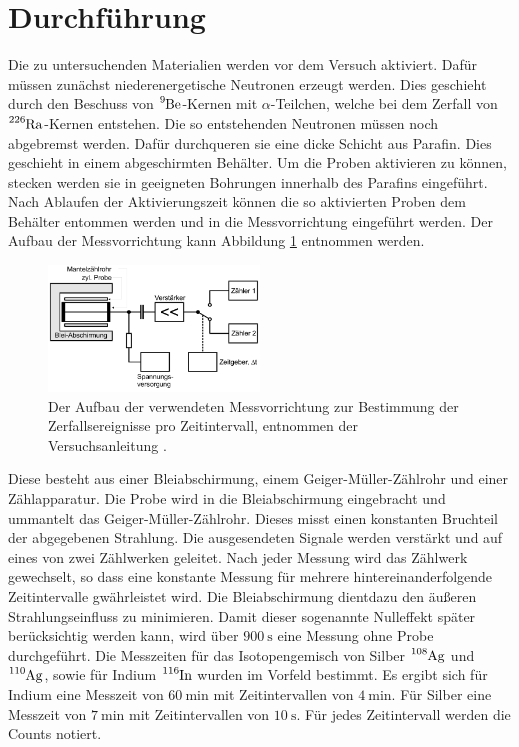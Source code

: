 \section{Durchführung}
\label{sec:Durchführung}

Die zu untersuchenden Materialien werden vor dem Versuch aktiviert.
Dafür müssen zunächst niederenergetische Neutronen erzeugt werden.
Dies geschieht durch den Beschuss von $\ce{^{9}Be}$-Kernen mit $\alpha$-Teilchen, welche bei dem Zerfall von $\ce{^{226}Ra}$-Kernen entstehen.
Die so entstehenden Neutronen müssen noch abgebremst werden.
Dafür durchqueren sie eine dicke Schicht aus Parafin.
Dies geschieht in einem abgeschirmten Behälter.
Um die Proben aktivieren zu können, stecken werden sie in geeigneten Bohrungen innerhalb des Parafins eingeführt.
Nach Ablaufen der Aktivierungszeit können die so aktivierten Proben dem Behälter entommen werden und in die Messvorrichtung eingeführt werden.
Der Aufbau der Messvorrichtung kann Abbildung \ref{fig:Aufbau} entnommen werden.

\begin{figure}
  \centering
  \includegraphics[width=0.5\textwidth]{images/Aufbau.png}
  \caption{Der Aufbau der verwendeten Messvorrichtung zur Bestimmung der Zerfallsereignisse pro Zeitintervall, entnommen der Versuchsanleitung \cite[8]{sample}.}
  \label{fig:Aufbau}
\end{figure}

Diese besteht aus einer Bleiabschirmung, einem Geiger-Müller-Zählrohr und einer Zählapparatur.
Die Probe wird in die Bleiabschirmung eingebracht und ummantelt das Geiger-Müller-Zählrohr.
Dieses misst einen konstanten Bruchteil der abgegebenen Strahlung.
Die ausgesendeten Signale werden verstärkt und auf eines von zwei Zählwerken geleitet.
Nach jeder Messung wird das Zählwerk gewechselt, so dass eine konstante Messung für mehrere hintereinanderfolgende Zeitintervalle gwährleistet wird.
Die Bleiabschirmung dientdazu den äußeren Strahlungseinfluss zu minimieren.
Damit dieser sogenannte Nulleffekt später berücksichtig werden kann, wird über $\SI{900}{\second}$ eine Messung ohne Probe durchgeführt.
Die Messzeiten für das Isotopengemisch von Silber $\ce{^{108}Ag}$ und $\ce{^{110}Ag}$, sowie für Indium $\ce{^{116}In}$ wurden im Vorfeld bestimmt.
Es ergibt sich für Indium eine Messzeit von $\SI{60}{\minute}$ mit Zeitintervallen von $\SI{4}{\minute}$.
Für Silber eine Messzeit von $\SI{7}{\minute}$ mit Zeitintervallen von $\SI{10}{\second}$.
Für jedes Zeitintervall werden die Counts notiert.
